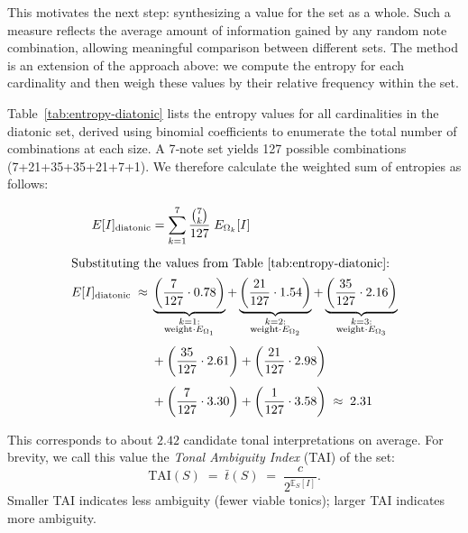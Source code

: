 \documentclass[10pt,twocolumn]{article}
\numberwithin{equation}{section} %
\begin{document}
    This motivates the next step: synthesizing a value for the set as a whole.
    Such a measure reflects the average amount of information gained by any random note combination, allowing meaningful comparison between different sets.
    The method is an extension of the approach above: we compute the entropy for each cardinality and then weigh these values by their relative frequency within the set.

    Table~\ref{tab:entropy-diatonic} lists the entropy values for all cardinalities in the diatonic set, derived using binomial coefficients to enumerate the total number of combinations at each size.
    A 7‑note set yields 127 possible combinations (7+21+35+35+21+7+1).
    We therefore calculate the weighted sum of entropies as follows:

    \begin{align}
        E[I]_{\text{diatonic}} &= \sum_{k=1}^{7} \frac{\binom{7}{k}}{127} \; E_{\Omega_k}[I]
        \label{eq:diatonic-avg} \\[4pt]
        \intertext{Substituting the values from Table~\ref{tab:entropy-diatonic}:}
        E[I]_{\text{diatonic}} \;\approx\; &
        \underbrace{\left( \frac{7}{127} \cdot 0.78 \right)}_{\substack{k=1:\\ \text{weight}\cdot E_{\Omega_1}}} +
        \underbrace{\left( \frac{21}{127} \cdot 1.54 \right)}_{\substack{k=2:\\ \text{weight}\cdot E_{\Omega_2}}} +
        \underbrace{\left( \frac{35}{127} \cdot 2.16 \right)}_{\substack{k=3:\\ \text{weight}\cdot E_{\Omega_3}}}
        \notag \\[4pt]
        &+ \left( \frac{35}{127} \cdot 2.61 \right) +
        \left( \frac{21}{127} \cdot 2.98 \right)
        \notag \\[4pt]
        &+ \left( \frac{7}{127} \cdot 3.30 \right) +
        \left( \frac{1}{127} \cdot 3.58 \right)
        \;\approx\; 2.31
        \label{eq:diatonic-sub}
    \end{align}

    

    This corresponds to about $2.42$ candidate tonal interpretations on average.
    For brevity, we call this value the \emph{Tonal Ambiguity Index} (TAI) of the set:
    \[
        \mathrm{TAI}(S) \;=\; \bar{t}(S) \;=\; \frac{c}{2^{\mathbb{E}_S[I]}}.
    \]
    Smaller TAI indicates less ambiguity (fewer viable tonics); larger TAI indicates more ambiguity.
\end{document}
